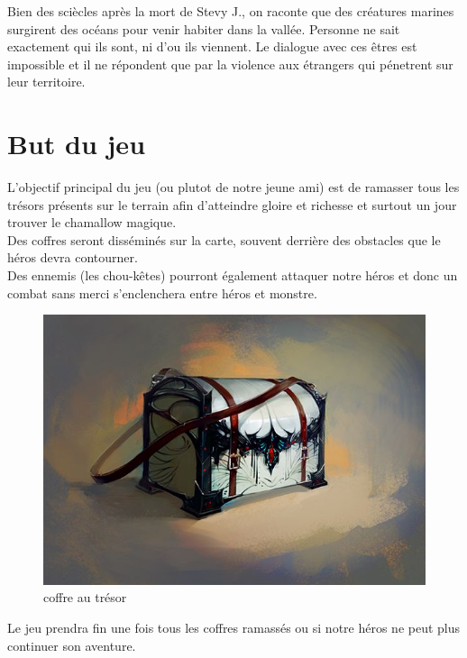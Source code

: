 \documentclass[a4paper 12pts]{article}
\begin{document}
\vspace{0.8 cm}

Bien des sciècles après la mort de Stevy J., on raconte que des créatures marines surgirent des océans pour venir habiter dans la vallée.
Personne ne sait exactement qui ils sont, ni d'ou ils viennent. Le dialogue avec ces êtres est impossible et il ne répondent que par la violence aux étrangers qui
pénetrent sur leur territoire.




\section{But du jeu}


\vspace{2cm}

L'objectif principal du jeu (ou plutot de notre jeune ami) est de ramasser tous les trésors présents 
sur le terrain afin d'atteindre gloire et richesse et surtout un jour trouver le chamallow magique.\\

Des coffres seront disséminés sur la carte, souvent derrière des obstacles que le héros devra contourner.\\ 
Des ennemis (les chou-kêtes) pourront également attaquer notre héros et donc un combat sans merci s'enclenchera entre héros et monstre.\\


\begin{figure}[h]
   \includegraphics[width=350pt]{Illustration/coffre.jpg}
\caption{coffre au trésor}
\end{figure}


Le jeu prendra fin une fois tous les coffres ramassés ou si notre héros ne peut plus continuer son aventure.
\end{document}
